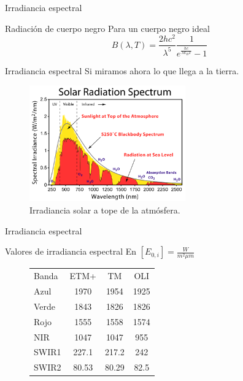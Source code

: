 \documentclass[]{beamer}
\begin{document}
\begin{frame}{Irradiancia espectral}
  \begin{block}{Radiación de cuerpo negro}
    Para un cuerpo negro ideal
    \begin{equation}
      B(\lambda,T) = \frac{2hc^2}{\lambda^5}\frac{1}{e^{\frac{hc}{\lambda k_B T}}-1}
    \end{equation}
  \end{block}
\end{frame}

\begin{frame}{Irradiancia espectral}
  Si miramos ahora lo que llega a la tierra.
  \begin{figure}
    \includegraphics[width=0.6\textwidth]{imagenes/solar_spectrum.png}
    \caption{Irradiancia solar a tope de la atmósfera.}
  \end{figure}
\end{frame}

\begin{frame}{Irradiancia espectral}
  \begin{exampleblock}{Valores de irradiancia espectral}
    En $[E_{0,i}] = \frac{W}{m^2 \mu m}$
    \begin{figure}
      \begin{tabular}{l c c c}
          Banda & ETM+  & TM    &  OLI \\
          Azul     & 1970  & 1954  & 1925 \\
          Verde     & 1843  & 1826  & 1826 \\
          Rojo     & 1555  & 1558  & 1574 \\
          NIR     & 1047  & 1047  & 955  \\
          SWIR1     & 227.1 & 217.2 & 242 \\
          SWIR2     & 80.53 & 80.29 & 82.5\\
      \end{tabular}
    \end{figure}
  \end{exampleblock}
\end{frame}
\end{document}
